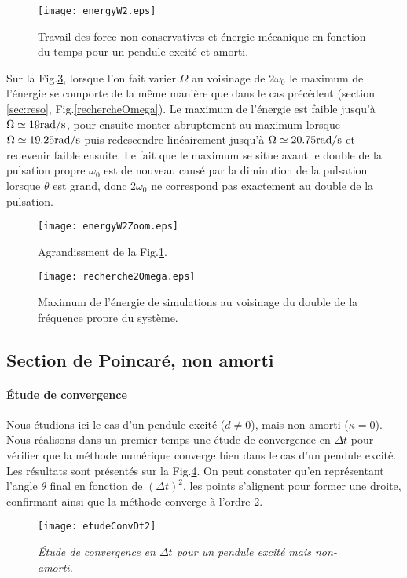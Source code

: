 \documentclass[a4paper,12pt,oneside]{article}
\def \t {\theta}
\begin{document}
\begin{figure}[H]
    \centering
    \texttt{[image: energyW2.eps]}
    \caption{Travail des force non-conservatives et énergie mécanique en fonction du temps pour un pendule excité et amorti.}
    \label{fig:energy2W}
\end{figure}

Sur la Fig.\ref{fig:recherche2omega}, lorsque l'on fait varier $\Omega$ au voisinage de $2\omega_0$ le maximum de l'énergie se comporte de la même manière que dans le cas précédent (section \ref{sec:reso}, Fig.\eqref{rechercheOmega}). Le maximum de l'énergie est faible jusqu'à $\Omega \simeq 19\rm{rad/s}$, pour ensuite monter abruptement au maximum lorsque $\Omega \simeq 19.25\rm{rad/s}$ puis redescendre linéairement jusqu'à $\Omega \simeq 20.75\rm{rad/s}$ et redevenir faible ensuite. Le fait que le maximum se situe avant le double de la pulsation propre $\omega_0$ est de nouveau causé par la diminution de la pulsation lorsque $\t $ est grand, donc $2\omega_0$ ne correspond pas exactement au double de la pulsation. 
\begin{figure}[H]
    \centering
    \texttt{[image: energyW2Zoom.eps]}
    \caption{Agrandissment de la Fig.\ref{fig:energy2W}.}
    \label{fig:energyW2zoom}
\end{figure}
\begin{figure}[H]
    \centering
    \texttt{[image: recherche2Omega.eps]}
    \caption{Maximum de l'énergie de simulations au voisinage du double de la fréquence propre du système.}
    \label{fig:recherche2omega}
\end{figure}
\subsection{Section de Poincaré, non amorti}
\paragraph{Étude de convergence}
Nous étudions ici le cas d'un pendule excité ($d \neq 0$), mais non amorti ($\kappa=0$). Nous réalisons dans un premier temps une étude de convergence en $\Delta t$ pour vérifier que la méthode numérique converge bien dans le cas d'un pendule excité. Les résultats sont présentés sur la Fig.\ref{etudeConvDt2}. On peut constater qu'en représentant l'angle $\t$ final en fonction de $(\Delta t)^2$, les points s'alignent pour former une droite, confirmant ainsi que la méthode converge à l'ordre 2.
\begin{figure}[H]
    \centerline{\texttt{[image: etudeConvDt2]}}
\caption{ \label{etudeConvDt2}\em
Étude de convergence en $\Delta t$ pour un pendule excité mais non-amorti.
}
\end{figure}
\end{document}
